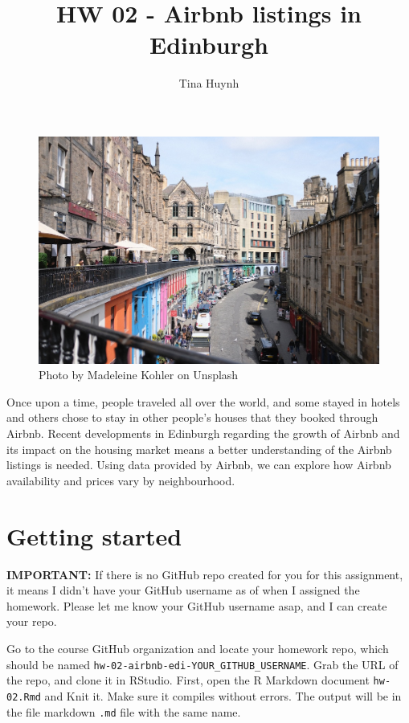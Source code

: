 \documentclass[
]{article}
\title{HW 02 - Airbnb listings in Edinburgh}
\author{Tina Huynh}
\date{}
\begin{document}
\maketitle

{
\setcounter{tocdepth}{2}
\tableofcontents
}
\begin{figure}
\includegraphics[width=0.8\linewidth]{img/madeleine-kohler-90Qn643Pq9c-unsplash} \caption{Photo by Madeleine Kohler on Unsplash}\label{fig:photo}
\end{figure}

Once upon a time, people traveled all over the world, and some stayed in
hotels and others chose to stay in other people's houses that they
booked through Airbnb. Recent developments in Edinburgh regarding the
growth of Airbnb and its impact on the housing market means a better
understanding of the Airbnb listings is needed. Using data provided by
Airbnb, we can explore how Airbnb availability and prices vary by
neighbourhood.

\section{Getting started}\label{getting-started}

\begin{marginnote}
\textbf{IMPORTANT:} If there is no GitHub repo created for you for this
assignment, it means I didn't have your GitHub username as of when I
assigned the homework. Please let me know your GitHub username asap, and
I can create your repo.
\end{marginnote}

Go to the course GitHub organization and locate your homework repo,
which should be named \texttt{hw-02-airbnb-edi-YOUR\_GITHUB\_USERNAME}.
Grab the URL of the repo, and clone it in RStudio. First, open the R
Markdown document \texttt{hw-02.Rmd} and Knit it. Make sure it compiles
without errors. The output will be in the file markdown \texttt{.md}
file with the same name.
\end{document}
